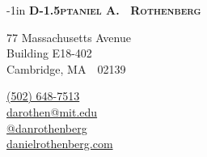 \documentclass[11pt,letterpaper]{article}
\makeatletter
\def\myemail{darothen@mit.edu}
\def\mytwitter{danrothenberg}
\def\mywebsite{http://www.danielrothenberg.com}
\def\mywebsiteshort{danielrothenberg.com}
\def\myphone{(502) 648-7513}
\makeatother
\begin{document}
\pagestyle{fancy} \setlength\headwidth{6.5in}
 \cfoot{}
\thispagestyle{empty}
\begin{adjustwidth}{-1in}{}
{\Large\textbf{
  {\textsc{%
    {D}\kern-1.5ptaniel
    {A}\kern-2pt.~%
    {R}othenberg}
  }
 }
}
\hfill\hfill\hfill
{\small
  \begin{minipage}[b]{1.6in}
    \flushleft \footnotesize
    77 Massachusetts Avenue \\
    Building E18-402 \\
    Cambridge, MA~~02139
  \end{minipage}
  \hfill
  \begin{minipage}[b]{1.6in}
    \flushright \footnotesize
    \href{tel:\myphone}{\myphone}~\faPhone \\
    \href{mailto:\myemail}{\myemail} ~\faEnvelope \\
    \href{https://www.twitter.com/\mytwitter}{@\mytwitter} ~\faTwitter \\
    \href{\mywebsite}{\mywebsiteshort} ~\faGlobe %
  \end{minipage}
}\par
\hrulefill
\end{adjustwidth}
\reversemarginpar
\setlength\marginparwidth{0.85in}
\end{document}
